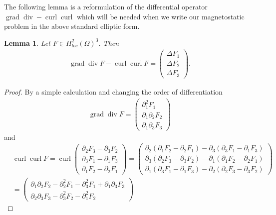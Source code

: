 \documentclass[12pt,a4paper]{article}
\numberwithin{equation}{subsection}
\newtheorem{lemma}{Lemma}[section]
\numberwithin{lemma}{subsection}
\theoremstyle{definition}
\DeclareMathOperator{\curl}{curl}
\DeclareMathOperator{\diver}{div}
\DeclareMathOperator{\grad}{grad}
\begin{document}
The following lemma is a reformulation of the differential operator 
$\grad \diver - \curl \curl$ which will be needed when we write our 
magnetostatic problem in the above standard elliptic form.

\begin{lemma}
    Let $F \in H^2_{loc}(\Omega)^3$. Then 
    \begin{align*}
        \grad \diver F - \curl \curl F 
        = \begin{pmatrix} \Delta F_1 \\ \Delta F_2 
            \\ \Delta F_3  \end{pmatrix}.
    \end{align*}
\end{lemma}
\begin{proof}
    By a simple calculation and changing the order of differentiation
    \begin{align*}
        \grad \diver F = \begin{pmatrix} \partial_1^2 F_1 \\ \partial_1\partial_2 
            F_2 \\ \partial_1 \partial_3 F_3  \end{pmatrix}    
    \end{align*}
    and 
    \begin{align*}
        &\curl \curl F = \curl \begin{pmatrix} 
            \partial_2 F_3 - \partial_3 F_2 \\ \partial_3 F_1 - \partial_1 F_3 
            \\ \partial_1 F_2 - \partial_2 F_1  \end{pmatrix}
        = \begin{pmatrix} 
            \partial_2 (\partial_1 F_2 - \partial_2 F_1)
                - \partial_3 (\partial_3 F_1 - \partial_1 F_3)
            \\ \partial_3 (\partial_2 F_3 - \partial_3 F_2)
                - \partial_1 (\partial_1 F_2 - \partial_2 F_1)
            \\ \partial_1 (\partial_3 F_1 - \partial_1 F_3)
                - \partial_2 (\partial_2 F_3 - \partial_3 F_2)  
            \end{pmatrix}
        \\ &= \begin{pmatrix}
            \partial_1 \partial_2 F_2 - \partial^2_2 F_1 - \partial_3^2 F_1
            + \partial_1 \partial_3 F_3 
            \\ \partial_2 \partial_3 F_3 - \partial^2_3 F_2 - \partial_1^2 F_2

\end{pmatrix}
\end{align*}
\end{proof}
\end{document}
